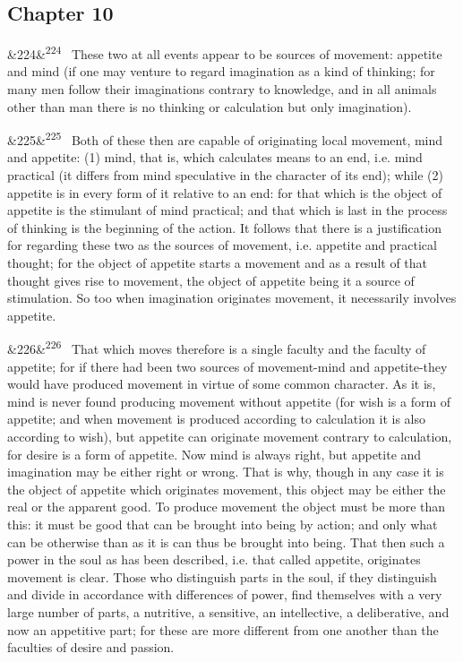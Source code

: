 \documentclass[12pt]{article}
\newcommand{\para}[1][]{\par\noindent\ifx&#1&\else\textsuperscript{\footnotesize #1}~\fi}
\begin{document}
\subsection*{Chapter 10}

\para[224] These two at all events appear to be sources of movement: appetite and mind (if one may venture to regard imagination as a kind of thinking; for many men follow their imaginations contrary to knowledge, and in all animals other than man there is no thinking or calculation but only imagination).

\para[225] Both of these then are capable of originating local movement, mind and appetite: (1) mind, that is, which calculates means to an end, i.e. mind practical (it differs from mind speculative in the character of its end); while (2) appetite is in every form of it relative to an end: for that which is the object of appetite is the stimulant of mind practical; and that which is last in the process of thinking is the beginning of the action. It follows that there is a justification for regarding these two as the sources of movement, i.e. appetite and practical thought; for the object of appetite starts a movement and as a result of that thought gives rise to movement, the object of appetite being it a source of stimulation. So too when imagination originates movement, it necessarily involves appetite.

\para[226] That which moves therefore is a single faculty and the faculty of appetite; for if there had been two sources of movement-mind and appetite-they would have produced movement in virtue of some common character. As it is, mind is never found producing movement without appetite (for wish is a form of appetite; and when movement is produced according to calculation it is also according to wish), but appetite can originate movement contrary to calculation, for desire is a form of appetite. Now mind is always right, but appetite and imagination may be either right or wrong. That is why, though in any case it is the object of appetite which originates movement, this object may be either the real or the apparent good. To produce movement the object must be more than this: it must be good that can be brought into being by action; and only what can be otherwise than as it is can thus be brought into being. That then such a power in the soul as has been described, i.e. that called appetite, originates movement is clear. Those who distinguish parts in the soul, if they distinguish and divide in accordance with differences of power, find themselves with a very large number of parts, a nutritive, a sensitive, an intellective, a deliberative, and now an appetitive part; for these are more different from one another than the faculties of desire and passion.
\end{document}

